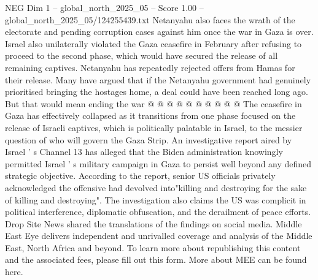 \begin{textsample}{NEG Dim 1 – global\_north\_2025\_05 – Score 1.00 – global\_north\_2025\_05/124255439.txt}
Netanyahu also faces the wrath of the electorate and pending corruption cases against him once the war in Gaza is over.
Israel also unilaterally violated the Gaza ceasefire in February after refusing to proceed to the second phase, which would have secured the release of all remaining captives.
Netanyahu has repeatedly rejected offers from Hamas for their release.
Many have argued that if the Netanyahu government had genuinely prioritised bringing the hostages home, a deal could have been reached long ago.
But that would mean ending the war @ @ @ @ @ @ @ @ @ @ The ceasefire in Gaza has effectively collapsed as it transitions from one phase focused on the release of Israeli captives, which is politically palatable in Israel, to the messier question of who will govern the Gaza Strip.
An investigative report aired by Israel ' s Channel 13 has alleged that the Biden administration knowingly permitted Israel ' s military campaign in Gaza to persist well beyond any defined strategic objective.
According to the report, senior US officials privately acknowledged the offensive had devolved into"killing and destroying for the sake of killing and destroying".
The investigation also claims the US was complicit in political interference, diplomatic obfuscation, and the derailment of peace efforts.
Drop Site News shared the translations of the findings on social media.
Middle East Eye delivers independent and unrivalled coverage and analysis of the Middle East, North Africa and beyond.
To learn more about republishing this content and the associated fees, please fill out this form.
More about MEE can be found here.

\end{textsample}
